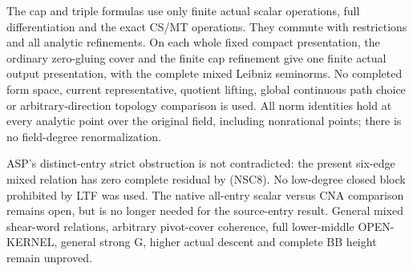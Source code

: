 The cap and triple formulas use only finite actual
scalar operations, full differentiation and the exact
CS/MT operations.  They commute with restrictions and
all analytic refinements.  On each whole fixed compact
presentation, the ordinary zero-gluing cover and the
finite cap refinement give one finite actual output
presentation, with the complete mixed Leibniz seminorms.
No completed form space, current representative,
quotient lifting, global continuous path choice or
arbitrary-direction topology comparison is used.
All norm identities hold at every analytic point over
the original field, including nonrational points;
there is no field-degree renormalization.

ASP's distinct-entry strict obstruction is not contradicted:
the present six-edge mixed relation has zero complete
residual by (NSC8).  No low-degree closed block prohibited
by LTF was used.  The native all-entry scalar versus CNA
comparison remains open, but is no longer needed for
the source-entry result.  General mixed shear-word
relations, arbitrary pivot-cover coherence, full
lower-middle OPEN-KERNEL, general strong G, higher
actual descent and complete BB height remain unproved.
